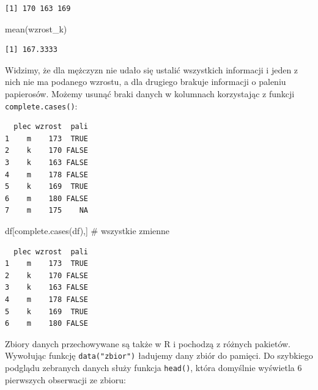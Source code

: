 \documentclass[
  letterpaper,
  DIV=11,
  numbers=noendperiod]{scrreprt}
\newenvironment{Shaded}{\begin{snugshade}}{\end{snugshade}}
\newcommand{\CommentTok}[1]{\textcolor[rgb]{0.37,0.37,0.37}{#1}}
\newcommand{\FunctionTok}[1]{\textcolor[rgb]{0.28,0.35,0.67}{#1}}
\newcommand{\NormalTok}[1]{\textcolor[rgb]{0.00,0.23,0.31}{#1}}
\newcommand{\SpecialCharTok}[1]{\textcolor[rgb]{0.37,0.37,0.37}{#1}}
\begin{document}
\begin{verbatim}
[1] 170 163 169
\end{verbatim}

\begin{Shaded}
\begin{Highlighting}[]
\FunctionTok{mean}\NormalTok{(wzrost\_k)}
\end{Highlighting}
\end{Shaded}

\begin{verbatim}
[1] 167.3333
\end{verbatim}

Widzimy, że dla mężczyzn nie udało się ustalić wszystkich informacji i
jeden z nich nie ma podanego wzrostu, a dla drugiego brakuje informacji
o paleniu papierosów. Możemy usunąć braki danych w kolumnach korzystając
z funkcji \texttt{complete.cases()}:

\begin{Shaded}
\end{Shaded}

\begin{verbatim}
  plec wzrost  pali
1    m    173  TRUE
2    k    170 FALSE
3    k    163 FALSE
4    m    178 FALSE
5    k    169  TRUE
6    m    180 FALSE
7    m    175    NA
\end{verbatim}

\begin{Shaded}
\begin{Highlighting}[]
\NormalTok{df[}\FunctionTok{complete.cases}\NormalTok{(df),] }\CommentTok{\# wszystkie zmienne}
\end{Highlighting}
\end{Shaded}

\begin{verbatim}
  plec wzrost  pali
1    m    173  TRUE
2    k    170 FALSE
3    k    163 FALSE
4    m    178 FALSE
5    k    169  TRUE
6    m    180 FALSE
\end{verbatim}

Zbiory danych przechowywane są także w R i pochodzą z różnych pakietów.
Wywołując funkcję \texttt{data("zbior")} ładujemy dany zbiór do pamięci.
Do szybkiego podglądu zebranych danych służy funkcja \texttt{head()},
która domyślnie wyświetla 6 pierwszych obserwacji ze zbioru:
\end{document}
